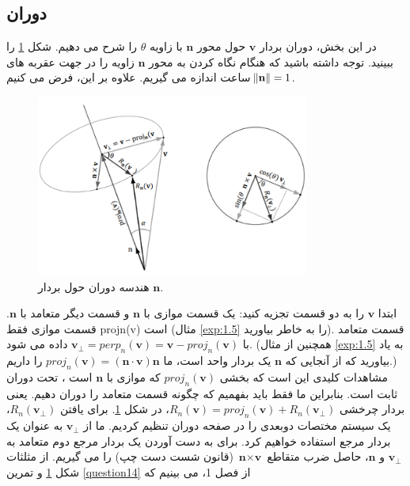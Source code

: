\subsection{\textbf{دوران}}
{
    \Large
    \begin{spacing}{1.5}
        در این بخش، دوران بردار $\textbf{v}$ حول محور $\textbf{n}$ با زاویه $\theta$ را شرح می دهیم.
        شکل \ref{fig:4.Session.1.3.3} را ببینید.
        توجه داشته باشید که هنگام نگاه کردن به محور $\textbf{n}$ زاویه را در جهت عقربه های ساعت اندازه می گیریم.
        علاوه بر این، فرض می کنیم $\norm{\textbf{n}}=1$.

        \begin{figure}[H]
            \centering
            \setlength{\belowcaptionskip}{-10pt}
            \includegraphics[width=0.8\textwidth]{Images/4/3/4.Session.1.3.3}
            \caption {هندسه دوران حول بردار $\textbf{n}$.}
            \label{fig:4.Session.1.3.3}
        \end{figure}

        ابتدا $\textbf{v}$ را به دو قسمت تجزیه کنید:
        یک قسمت موازی با $\textbf{n}$ و قسمت دیگر متعامد با $\textbf{n}$.
        قسمت موازی فقط projn(v) است (مثال \ref{exp:1.5} را به خاطر بیاورید).
        قسمت متعامد با $\textbf{v}_{\perp}=perp_{n}(\textbf{v})=\textbf{v}-proj_{n}(\textbf{v})$ داده می شود.
        (همچنین از مثال \ref{exp:1.5} به یاد بیاورید که از آنجایی که $\textbf{n}$ یک بردار واحد است، ما $proj_{n}(\textbf{v})= (\textbf{n}\cdot\textbf{v})\textbf{n}$ را داریم.)
        مشاهدات کلیدی این است که بخشی $proj_{n}(\textbf{v})$ که موازی با $\textbf{n}$ است ، تحت دوران ثابت است.
        بنابراین ما فقط باید بفهمیم که چگونه قسمت متعامد را دوران دهیم. یعنی بردار چرخشی $R_{n}(\textbf{v})=proj_{n}(\textbf{v})+R_{n}(\textbf{v}_{\perp})$، در شکل \ref{fig:4.Session.1.3.3}.
        برای یافتن $R_{n}(\textbf{v}_{\perp})$، یک سیستم مختصات دوبعدی را در صفحه دوران تنظیم کردیم.
        ما از $\textbf{v}_{\perp}$ به عنوان یک بردار مرجع استفاده خواهیم کرد.
        برای به دست آوردن یک بردار مرجع دوم متعامد به $\textbf{v}_{\perp}$ و $\textbf{n}$،
        حاصل ضرب متقاطع $\textbf{n}\times\textbf{v}$ (قانون شست دست چپ) را می گیریم. از مثلثات شکل \ref{fig:4.Session.1.3.3} و تمرین \ref{question14} از فصل 1، می بینیم که


\end{spacing}}
